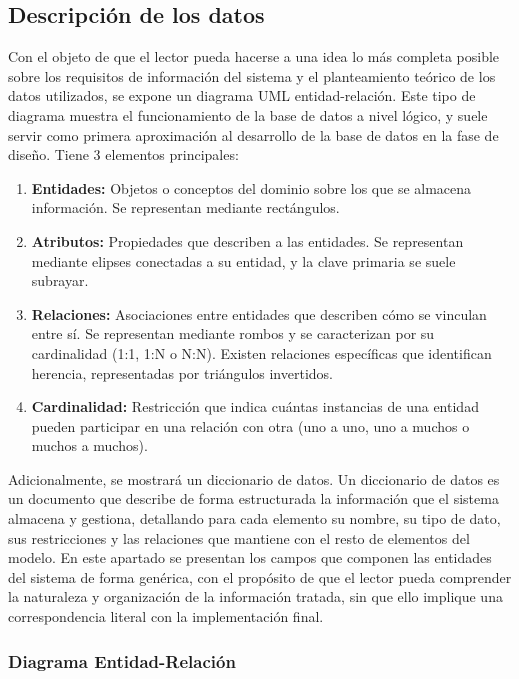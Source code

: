 
\subsection{Descripción de los datos}
Con el objeto de que el lector pueda hacerse a una idea lo más completa posible sobre los requisitos de información del sistema y el planteamiento teórico de los datos utilizados, se expone un diagrama UML entidad-relación. Este tipo de diagrama muestra el funcionamiento de la base de datos a nivel lógico, y suele servir como primera aproximación al desarrollo de la base de datos en la fase de diseño. Tiene 3 elementos principales:
\begin{enumerate}
	\item \textbf{Entidades:} Objetos o conceptos del dominio sobre los que se almacena información. Se representan mediante rectángulos.
	
	\item \textbf{Atributos:} Propiedades que describen a las entidades. Se representan mediante elipses conectadas a su entidad, y la clave primaria se suele subrayar.
	
	\item \textbf{Relaciones:} Asociaciones entre entidades que describen cómo se vinculan entre sí. Se representan mediante rombos y se caracterizan por su cardinalidad (1:1, 1:N o N:N). Existen relaciones específicas que identifican herencia, representadas por triángulos invertidos.
	
	\item \textbf{Cardinalidad:} Restricción que indica cuántas instancias de una entidad pueden participar en una relación con otra (uno a uno, uno a muchos o muchos a muchos).
\end{enumerate}

Adicionalmente, se mostrará un diccionario de datos. Un diccionario de datos es un documento que describe de forma estructurada la información que el sistema almacena y gestiona, detallando para cada elemento su nombre, su tipo de dato, sus restricciones y las relaciones que mantiene con el resto de elementos del modelo. En este apartado se presentan los campos que componen las entidades del sistema de forma genérica, con el propósito de que el lector pueda comprender la naturaleza y organización de la información tratada, sin que ello implique una correspondencia literal con la implementación final.

\subsubsection{Diagrama Entidad-Relación}

